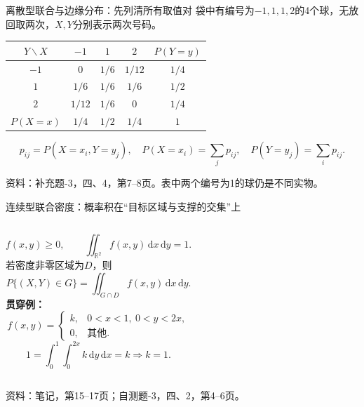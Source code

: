 \documentclass[aspectratio=169,10pt]{beamer}
\newcommand{\dd}{\,\mathrm{d}}
\newcommand{\R}{\mathbb{R}}
\newcommand{\source}[1]{\vfill{\color{Muted}\fontsize{6.5}{8}\selectfont 资料：#1\par}}
\begin{document}
\begin{frame}[t]{离散型联合与边缘分布：先列清所有取值对}
袋中有编号为$-1,1,1,2$的4个球，无放回取两次，$X,Y$分别表示两次号码。
\renewcommand{\arraystretch}{1.45}
\begin{center}
\begin{tabular}{c|ccc|c}
\toprule
$Y\backslash X$ & $-1$ & $1$ & $2$ & $P(Y=y)$\\\midrule
$-1$ & $0$ & $1/6$ & $1/12$ & $1/4$\\
$1$ & $1/6$ & $1/6$ & $1/6$ & $1/2$\\
$2$ & $1/12$ & $1/6$ & $0$ & $1/4$\\\midrule
$P(X=x)$ & $1/4$ & $1/2$ & $1/4$ & $1$\\\bottomrule
\end{tabular}
\end{center}
\[
p_{ij}=P(X=x_i,Y=y_j),\quad P(X=x_i)=\sum_jp_{ij},\quad P(Y=y_j)=\sum_ip_{ij}.
\]
\source{补充题-3，四、4，第7--8页。表中两个编号为1的球仍是不同实物。}
\end{frame}

\begin{frame}[t]{连续型联合密度：概率积在“目标区域与支撑的交集”上}
\begin{columns}[T]
\[
f(x,y)\ge0,\qquad\iint_{\R^2}f(x,y)\dd x\dd y=1.
\]
若密度非零区域为$D$，则
\[
P\{(X,Y)\in G\}=\iint_{G\cap D}f(x,y)\dd x\dd y.
\]
\textbf{贯穿例：}
\[
f(x,y)=\begin{cases}k,&0<x<1,\ 0<y<2x,\\0,&\text{其他}.\end{cases}
\]
\[
1=\int_0^1\!\int_0^{2x}k\dd y\dd x=k\Rightarrow k=1.
\]
\centering
{}
\end{columns}
\source{笔记，第15--17页；自测题-3，四、2，第4--6页。}
\end{frame}
\end{document}
